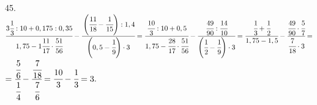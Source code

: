 45. $\cfrac{3\cfrac{1}{3}:10+0,175:0,35}{1,75-1\cfrac{11}{17}\cdot\cfrac{51}{56}}-
\cfrac{\left(\cfrac{11}{18}-\cfrac{1}{15}\right):1,4}{\left(0,5-\cfrac{1}{9}\right)\cdot3}=
\cfrac{\cfrac{10}{3}:10+0,5}{1,75-\cfrac{28}{17}\cdot\cfrac{51}{56}}-
\cfrac{\cfrac{49}{90}:\cfrac{14}{10}}{\left(\cfrac{1}{2}-\cfrac{1}{9}\right)\cdot3}=
\cfrac{\cfrac{1}{3}+\cfrac{1}{2}}{1,75-1,5}-
\cfrac{\cfrac{49}{90}\cdot\cfrac{5}{7}}{\cfrac{7}{18}\cdot3}=$\\$=
\cfrac{\cfrac{5}{6}}{\cfrac{1}{4}}-
\cfrac{\cfrac{7}{18}}{\cfrac{7}{6}}=\cfrac{10}{3}-\cfrac{1}{3}=3.$\\
